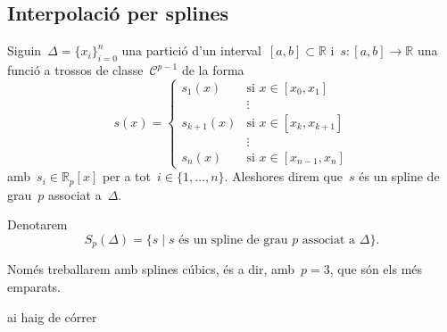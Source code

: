 \documentclass[../metodes-numerics.tex]{subfiles}
\begin{document}
    \subsection{Interpolació per splines}
    \begin{definition}
        Siguin~\(\Delta=\{x_{i}\}_{i=0}^{n}\) una partició d'un interval~\([a,b]\subset\mathbb{R}\) i~\(s\colon[a,b]\longrightarrow\mathbb{R}\) una funció a trossos de classe~\(\mathcal{C}^{p-1}\) de la forma
        \[s(x)=\begin{cases}
        s_{1}(x) & \text{si }x\in[x_{0},x_{1}]\\
        & \vdots\\
        s_{k+1}(x) & \text{si }x\in[x_{k},x_{k+1}]\\
        & \vdots\\
        s_{n}(x) & \text{si }x\in[x_{n-1},x_{n}]
        \end{cases}\]
        amb~\(s_{i}\in\mathbb{R}_{p}[x]\) per a tot~\(i\in\{1,\dots,n\}\).
        Aleshores direm que~\(s\) és un spline de grau~\(p\) associat a~\(\Delta\).

        Denotarem
        \[
            S_{p}(\Delta)=\{s\mid s\text{ és un spline de grau }p\text{ associat a }\Delta\}.
        \]
    \end{definition}
    \begin{note}
        Només treballarem amb splines cúbics, és a dir, amb~\(p=3\), que són els més emparats.
    \end{note}
    ai haig de córrer
\end{document}
